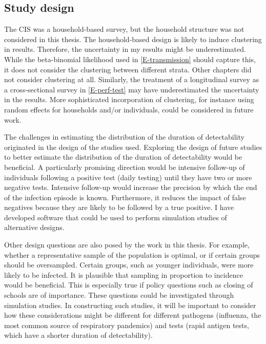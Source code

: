 \documentclass[thesis.tex]{subfiles}
\begin{document}
\subsection{Study design}

The CIS was a household-based survey, but the household structure was not considered in this thesis.
The household-based design is likely to induce clustering in results.
Therefore, the uncertainty in my results might be underestimated.
While the beta-binomial likelihood used in \cref{E-transmission} should capture this, it does not consider the clustering between different strata.
Other chapters did not consider clustering at all.
Similarly, the treatment of a longitudinal survey as a cross-sectional survey in \cref{E-perf-test} may have underestimated the uncertainty in the results.
More sophisticated incorporation of clustering, for instance using random effects for households and/or individuals, could be considered in future work.

The challenges in estimating the distribution of the duration of detectability originated in the design of the studies used.
Exploring the design of future studies to better estimate the distribution of the duration of detectability would be beneficial.
A particularly promising direction would be intensive follow-up of individuals following a positive test (\eg daily testing) until they have two or more negative tests.
Intensive follow-up would increase the precision by which the end of the infection episode is known.
Furthermore, it reduces the impact of false negatives because they are likely to be followed by a true positive.
I have developed software that could be used to perform simulation studies of alternative designs.

Other design questions are also posed by the work in this thesis.
For example, whether a representative sample of the population is optimal, or if certain groups should be oversampled.
Certain groups, such as younger individuals, were more likely to be infected.
It is plausible that sampling in proportion to incidence would be beneficial.
This is especially true if policy questions such as closing of schools are of importance.
These questions could be investigated through simulation studies.
In constructing such studies, it will be important to consider how these considerations might be different for different pathogens (\eg influenza, the most common source of respiratory pandemics) and tests (\eg rapid antigen tests, which have a shorter duration of detectability).
\end{document}
